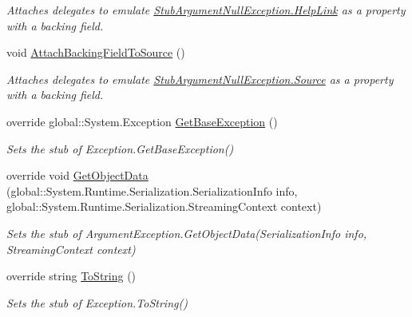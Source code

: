 \begin{DoxyCompactItemize}
\begin{DoxyCompactList}\small\item\em Attaches delegates to emulate \hyperlink{class_system_1_1_fakes_1_1_stub_argument_null_exception_a9d49f02b631fe75b844d83bbac406444}{Stub\-Argument\-Null\-Exception.\-Help\-Link} as a property with a backing field.\end{DoxyCompactList}\item 
void \hyperlink{class_system_1_1_fakes_1_1_stub_argument_null_exception_ae778ebe98eb082fc56a39aff08814806}{Attach\-Backing\-Field\-To\-Source} ()
\begin{DoxyCompactList}\small\item\em Attaches delegates to emulate \hyperlink{class_system_1_1_fakes_1_1_stub_argument_null_exception_ae8698aa05d3786f41afd6a37cd59e23b}{Stub\-Argument\-Null\-Exception.\-Source} as a property with a backing field.\end{DoxyCompactList}\item 
override global\-::\-System.\-Exception \hyperlink{class_system_1_1_fakes_1_1_stub_argument_null_exception_a4a8e607b8cda68b91e006033d0487760}{Get\-Base\-Exception} ()
\begin{DoxyCompactList}\small\item\em Sets the stub of Exception.\-Get\-Base\-Exception()\end{DoxyCompactList}\item 
override void \hyperlink{class_system_1_1_fakes_1_1_stub_argument_null_exception_a09259c939beaf9fd73f18d88dbc932ee}{Get\-Object\-Data} (global\-::\-System.\-Runtime.\-Serialization.\-Serialization\-Info info, global\-::\-System.\-Runtime.\-Serialization.\-Streaming\-Context context)
\begin{DoxyCompactList}\small\item\em Sets the stub of Argument\-Exception.\-Get\-Object\-Data(\-Serialization\-Info info, Streaming\-Context context)\end{DoxyCompactList}\item 
override string \hyperlink{class_system_1_1_fakes_1_1_stub_argument_null_exception_a998223065f941ef6cba3bf543c212968}{To\-String} ()
\begin{DoxyCompactList}\small\item\em Sets the stub of Exception.\-To\-String()\end{DoxyCompactList}\end{DoxyCompactItemize}
